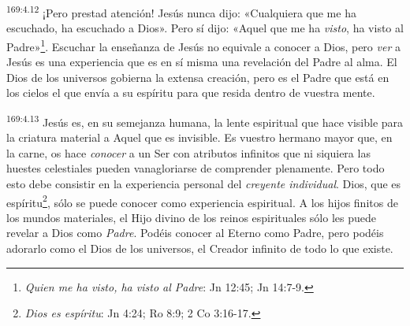 \par 
\textsuperscript{169:4.12} ¡Pero prestad atención! Jesús nunca dijo: «Cualquiera que me ha escuchado, ha escuchado a Dios». Pero sí dijo: «Aquel que me ha \textit{visto}, ha visto al Padre»\footnote{\textit{Quien me ha visto, ha visto al Padre}: Jn 12:45; Jn 14:7-9.}. Escuchar la enseñanza de Jesús no equivale a conocer a Dios, pero \textit{ver} a Jesús es una experiencia que es en sí misma una revelación del Padre al alma. El Dios de los universos gobierna la extensa creación, pero es el Padre que está en los cielos el que envía a su espíritu para que resida dentro de vuestra mente.

\par 
\textsuperscript{169:4.13} Jesús es, en su semejanza humana, la lente espiritual que hace visible para la criatura material a Aquel que es invisible. Es vuestro hermano mayor que, en la carne, os hace \textit{conocer} a un Ser con atributos infinitos que ni siquiera las huestes celestiales pueden vanagloriarse de comprender plenamente. Pero todo esto debe consistir en la experiencia personal del \textit{creyente individual}. Dios, que es espíritu\footnote{\textit{Dios es espíritu}: Jn 4:24; Ro 8:9; 2 Co 3:16-17.}, sólo se puede conocer como experiencia espiritual. A los hijos finitos de los mundos materiales, el Hijo divino de los reinos espirituales sólo les puede revelar a Dios como \textit{Padre}. Podéis conocer al Eterno como Padre, pero podéis adorarlo como el Dios de los universos, el Creador infinito de todo lo que existe.